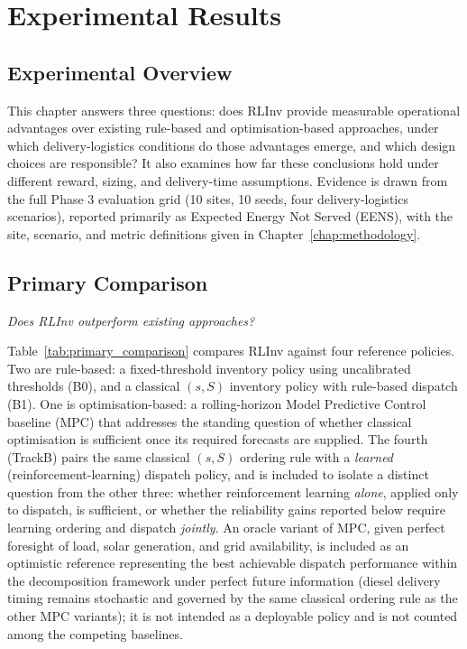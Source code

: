 \chapter{Experimental Results}
\label{chap:results}
\setlength{\emergencystretch}{1.5em}

\section{Experimental Overview}
\label{sec:results_overview}

This chapter answers three questions: does RLInv provide measurable
operational advantages over existing rule-based and optimisation-based
approaches, under which delivery-logistics conditions do those
advantages emerge, and which design choices are responsible? It also
examines how far these conclusions hold under different reward, sizing,
and delivery-time assumptions. Evidence
is drawn from the full Phase 3 evaluation grid (10 sites, 10 seeds,
four delivery-logistics scenarios), reported primarily as Expected
Energy Not Served (EENS), with the site, scenario, and metric
definitions given in Chapter~\ref{chap:methodology}.

\section{Primary Comparison}
\label{sec:primary_comparison}

\emph{Does RLInv outperform existing approaches?}

Table~\ref{tab:primary_comparison} compares RLInv against four
reference policies. Two are rule-based: a fixed-threshold inventory
policy using uncalibrated thresholds (B0), and a classical $(s,S)$ inventory policy with
rule-based dispatch (B1). One is optimisation-based: a rolling-horizon
Model Predictive Control baseline (MPC) that addresses the standing
question of whether classical optimisation is sufficient once its
required forecasts are supplied. The fourth (TrackB) pairs the same classical
$(s,S)$ ordering rule with a \emph{learned} (reinforcement-learning)
dispatch policy, and is included to isolate a distinct question from
the other three: whether reinforcement learning \emph{alone}, applied
only to dispatch, is sufficient, or whether the reliability gains
reported below require learning ordering and dispatch \emph{jointly}.
An oracle variant of MPC, given perfect foresight of load, solar
generation, and grid availability, is included as an optimistic reference representing the
best achievable dispatch performance within the decomposition
framework under perfect future information (diesel delivery timing remains
stochastic and governed by the same classical ordering rule as the
other MPC variants); it is not intended as a
deployable policy and is not counted among the competing baselines.

